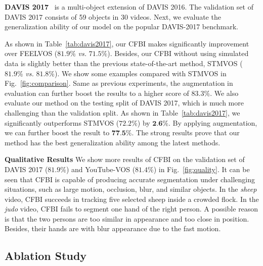 \documentclass[runningheads]{llncs}
\begin{document}
\noindent \textbf{DAVIS 2017}~\cite{davis2017} is a multi-object extension of DAVIS 2016. The validation set of DAVIS 2017 consists of 59 objects in 30 videos.
Next, we evaluate the generalization ability of our model on the popular DAVIS-2017 benchmark. 


As shown in Table~\ref{tab:davis2017}, our CFBI makes significantly improvement over FEELVOS ($\mathbf{81.9\%}$ \emph{vs.}\hspace{-0.8mm} $71.5\%$). Besides, our CFBI without using simulated data is slightly better than the previous state-of-the-art method, STMVOS ($\mathbf{81.9\%}$ \emph{vs.}\hspace{-0.8mm} $81.8\%$). We show some examples compared with STMVOS in Fig.~\ref{fig:comparison}. Same as previous experiments, the augmentation in evaluation can further boost the results to a higher score of $\mathbf{83.3\%}$. We also evaluate our method on the testing split of DAVIS 2017, which is much more challenging than the validation split. As shown in Table~\ref{tab:davis2017}, we significantly outperforms STMVOS ($72.2\%$) by $\textbf{2.6\%}$. By applying augmentation, we can further boost the result to $\textbf{77.5\%}$. The strong results prove that our method has the best generalization ability among the latest methods.





\noindent \textbf{Qualitative Results} We show more results of CFBI on the validation set of DAVIS 2017 ($\mathbf{81.9\%}$) and YouTube-VOS ($\mathbf{81.4\%}$) in Fig.~\ref{fig:quality}. It can be seen that CFBI is capable of producing accurate segmentation under challenging situations, such as large motion, occlusion, blur, and similar objects. In the \emph{sheep} video, CFBI succeeds in tracking five selected sheep inside a crowded flock. In the \emph{judo} video, CFBI fails to segment one hand of the right person. A possible reason is that the two persons are too similar in appearance and too close in position. Besides, their hands are with blur appearance due to the fast motion.




\subsection{Ablation Study}
\end{document}
